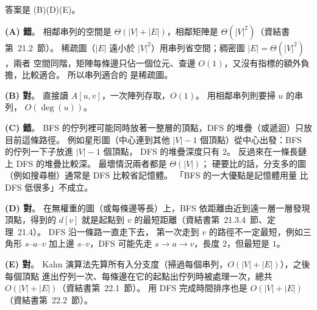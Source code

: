 \begin{pastsoln}
答案是 (B)(D)(E)。

\textbf{(A) 錯}。 相鄰串列的空間是 $\Theta(|V| + |E|)$，相鄰矩陣是 $\Theta(|V|^2)$（資結書
第~21.2~節）。 稀疏圖（$|E|$ 遠小於 $|V|^2$）用串列省空間；稠密圖 $|E| = \Theta(|V|^2)$，兩者
空間同階，矩陣每條邊只佔一個位元、查邊 $O(1)$，又沒有指標的額外負擔，比較適合。 所以串列適合的
是稀疏圖。

\textbf{(B) 對}。 直接讀 $A[u, v]$，一次陣列存取，$O(1)$。 用相鄰串列則要掃 $u$ 的串列，
$O(\deg(u))$。

\textbf{(C) 錯}。 BFS 的佇列裡可能同時放著一整層的頂點，DFS 的堆疊（或遞迴）只放目前這條路徑。
例如星形圖（中心連到其他 $|V| - 1$ 個頂點）從中心出發：BFS 的佇列一下子放進 $|V| - 1$ 個頂點，
DFS 的堆疊深度只有 $2$。 反過來在一條長鏈上 DFS 的堆疊比較深。 最壞情況兩者都是 $\Theta(|V|)$；
硬要比的話，分支多的圖（例如搜尋樹）通常是 DFS 比較省記憶體。 「BFS 的一大優點是記憶體用量
比 DFS 低很多」不成立。

\textbf{(D) 對}。 在無權重的圖（或每條邊等長）上，BFS 依距離由近到遠一層一層發現頂點，得到的
$d[v]$ 就是起點到 $v$ 的最短距離（資結書第~21.3.4~節、定理~21.4）。 DFS 沿一條路一直走下去，
第一次走到 $v$ 的路徑不一定最短，例如三角形 $s$–$a$–$v$ 加上邊 $s$–$v$，DFS 可能先走
$s \to a \to v$，長度 $2$，但最短是 $1$。

\textbf{(E) 對}。 Kahn 演算法先算所有入分支度（掃過每個串列，$O(|V| + |E|)$），之後每個頂點
進出佇列一次、每條邊在它的起點出佇列時被處理一次，總共 $O(|V| + |E|)$（資結書第~22.1~節）。
用 DFS 完成時間排序也是 $O(|V| + |E|)$（資結書第~22.2~節）。
\end{pastsoln}
